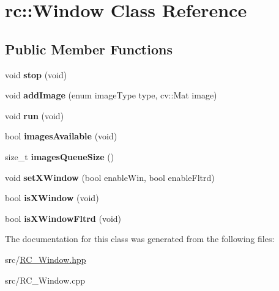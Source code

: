 \hypertarget{classrc_1_1Window}{\section{rc\+:\+:Window Class Reference}
\label{classrc_1_1Window}
}
\subsection*{Public Member Functions}
\begin{DoxyCompactItemize}
\item 
\hypertarget{classrc_1_1Window_a115530da5a987d8c241b0febc3cddc8f}{void {\bfseries stop} (void)}\label{classrc_1_1Window_a115530da5a987d8c241b0febc3cddc8f}

\item 
\hypertarget{classrc_1_1Window_aa34989ba0c08041b7e3bcc35125340ec}{void {\bfseries add\+Image} (enum image\+Type type, cv\+::\+Mat image)}\label{classrc_1_1Window_aa34989ba0c08041b7e3bcc35125340ec}

\item 
\hypertarget{classrc_1_1Window_a15681842c7ce0ee6b9201cfa973d2ac1}{void {\bfseries run} (void)}\label{classrc_1_1Window_a15681842c7ce0ee6b9201cfa973d2ac1}

\item 
\hypertarget{classrc_1_1Window_a7cb65cbb3741a7711631f66c46c7b039}{bool {\bfseries images\+Available} (void)}\label{classrc_1_1Window_a7cb65cbb3741a7711631f66c46c7b039}

\item 
\hypertarget{classrc_1_1Window_a3c221423c38f30757d042b2621f22894}{size\+\_\+t {\bfseries images\+Queue\+Size} ()}\label{classrc_1_1Window_a3c221423c38f30757d042b2621f22894}

\item 
\hypertarget{classrc_1_1Window_aac13c76846e47e026d66eaf4a52fcd57}{void {\bfseries set\+X\+Window} (bool enable\+Win, bool enable\+Fltrd)}\label{classrc_1_1Window_aac13c76846e47e026d66eaf4a52fcd57}

\item 
\hypertarget{classrc_1_1Window_abd9877b14cf84b02e7c6ea54c23bc082}{bool {\bfseries is\+X\+Window} (void)}\label{classrc_1_1Window_abd9877b14cf84b02e7c6ea54c23bc082}

\item 
\hypertarget{classrc_1_1Window_a01dcc54995ffd8c973423566b6734d44}{bool {\bfseries is\+X\+Window\+Fltrd} (void)}\label{classrc_1_1Window_a01dcc54995ffd8c973423566b6734d44}

\end{DoxyCompactItemize}


The documentation for this class was generated from the following files\+:\begin{DoxyCompactItemize}
\item 
src/\hyperlink{RC__Window_8hpp}{R\+C\+\_\+\+Window.\+hpp}\item 
src/R\+C\+\_\+\+Window.\+cpp\end{DoxyCompactItemize}
